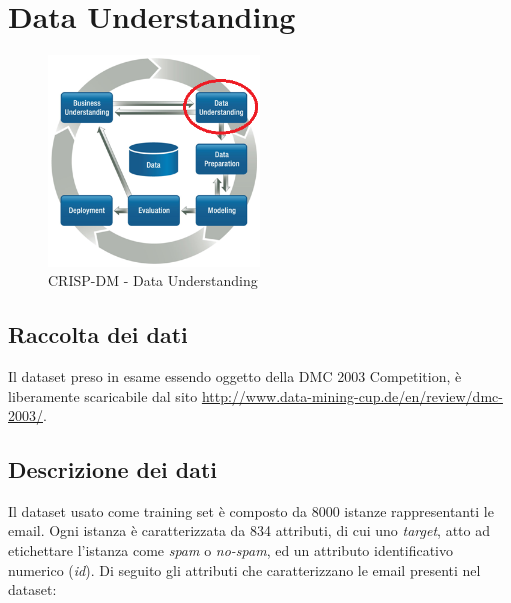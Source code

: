 \chapter{Data Understanding}
\begin{figure}[hbtp]
	\centering
	\includegraphics[width=0.5\textwidth]{./images/CRISPDM_2.png}
	\caption{CRISP-DM - Data Understanding}
	\label{CRISPDM_2}
\end{figure}
\section{Raccolta dei dati}
Il dataset preso in esame essendo oggetto della DMC 2003 Competition, è liberamente scaricabile dal sito \url{http://www.data-mining-cup.de/en/review/dmc-2003/}. 

\section{Descrizione dei dati}
Il dataset usato come training set è composto da 8000 istanze rappresentanti le email. Ogni istanza è caratterizzata da 834 attributi, di cui uno \textit{target}, atto ad etichettare l'istanza come \textit{spam} o \textit{no-spam}, ed un attributo identificativo numerico (\textit{id}). Di seguito gli attributi che caratterizzano le email presenti nel dataset:

